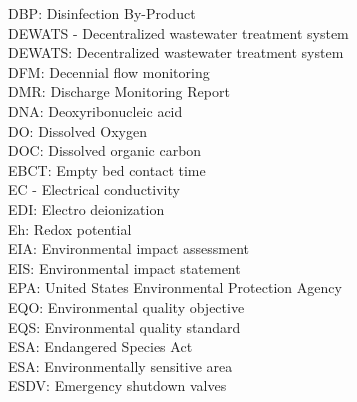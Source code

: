 \documentclass{article}
\begin{document}
DBP:  Disinfection By-Product
\vspace{0.3cm}\\
DEWATS - Decentralized wastewater treatment system
\vspace{0.3cm}\\
DEWATS:  Decentralized wastewater treatment system
\vspace{0.3cm}\\
DFM:  Decennial flow monitoring
\vspace{0.3cm}\\
DMR:  Discharge Monitoring Report
\vspace{0.3cm}\\
DNA:  Deoxyribonucleic acid
\vspace{0.3cm}\\
DO: Dissolved Oxygen
\vspace{0.3cm}\\
DOC:  Dissolved organic carbon
\vspace{0.3cm}\\
EBCT:  Empty bed contact time
\vspace{0.3cm}\\
EC - Electrical conductivity
\vspace{0.3cm}\\
EDI: Electro deionization
\vspace{0.3cm}\\
Eh:  Redox potential
\vspace{0.3cm}\\
EIA:  Environmental impact assessment
\vspace{0.3cm}\\
EIS:  Environmental impact statement
\vspace{0.3cm}\\
EPA:  United States Environmental Protection Agency
\vspace{0.3cm}\\
EQO:  Environmental quality objective
\vspace{0.3cm}\\
EQS:  Environmental quality standard
\vspace{0.3cm}\\
ESA:  Endangered Species Act
\vspace{0.3cm}\\
ESA:  Environmentally sensitive area
\vspace{0.3cm}\\
ESDV:  Emergency shutdown valves
\vspace{0.3cm}\\
\end{document}
